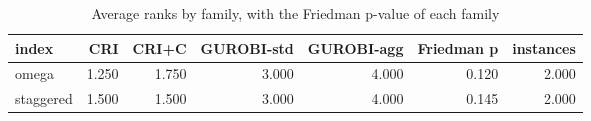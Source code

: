 \begin{table}[htbp]
\centering
\small
\caption{Average ranks by family, with the Friedman p-value of each family}
\label{tab:E3x_long_runs_xlarge_b600_ranks_by_family}
\begin{tabular}{lrrrrrr}
\toprule
index & CRI & CRI+C & GUROBI-std & GUROBI-agg & Friedman p & instances \\
\midrule
omega & 1.250 & 1.750 & 3.000 & 4.000 & 0.120 & 2.000 \\
staggered & 1.500 & 1.500 & 3.000 & 4.000 & 0.145 & 2.000 \\
\bottomrule
\end{tabular}
\end{table}
